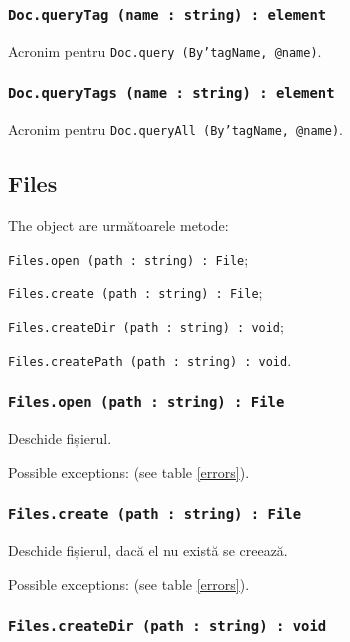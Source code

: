 \subsubsection{\texttt{Doc.queryTag (name : string) : element}}

Acronim pentru \texttt{Doc.query (By'tagName, @name)}.

\subsubsection{\texttt{Doc.queryTags (name : string) : element}}

Acronim pentru \texttt{Doc.queryAll (By'tagName, @name)}.

\subsection{{\color{orange} Files}}

The object \files{} are următoarele metode:
\begin{icItems}
	\item \texttt{Files.open (path : string) : File};
	\item \texttt{Files.create (path : string) : File};
	\item \texttt{Files.createDir (path : string) : void};
	\item \texttt{Files.createPath (path : string) : void}.
\end{icItems}

\subsubsection{\texttt{Files.open (path : string) : File}}

Deschide fișierul.

Possible exceptions:  (see table \ref{errors}).

\subsubsection{\texttt{Files.create (path : string) : File}}

Deschide fișierul, dacă el nu există se creează.

Possible exceptions:  (see table \ref{errors}).

\subsubsection{\texttt{Files.createDir (path : string) : void}}

